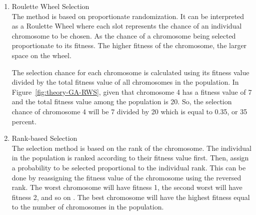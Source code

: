 \documentclass[12pt,oneside,openright,a4paper]{cpe-english-project}
\begin{document}
\begin{itemize}
\begin{enumerate}
		\item Roulette Wheel Selection \\
		The method is based on proportionate randomization. It can be interpreted as a Roulette Wheel where each slot represents the chance of an individual chromosome to be chosen. As the chance of a chromosome being selected proportionate to its fitness. The higher fitness of the chromosome, the larger space on the wheel.

		\begin{minipage}[c]{\textwidth}\centering
		\label{fig:theory-GA-RWS}
		\end{minipage}

		The selection chance for each chromosome is calculated using its fitness value divided by the total fitness value of all chromosomes in the population. In Figure~\ref{fig:theory-GA-RWS}, given that chromosome 4 has a fitness value of 7 and the total fitness value among the population is 20. So, the selection chance of chromosome 4 will be 7 divided by 20 which is equal to 0.35, or 35 percent.

		\item Rank-based Selection \\
		The selection method is based on the rank of the chromosome. The individual in the population is ranked according to their fitness value first. Then, assign a probability to be selected proportional to the individual rank. This can be done by reassigning the fitness value of the chromosome using the reversed rank. The worst chromosome will have fitness 1, the second worst will have fitness 2, and so on \cite{nidhi201comparative}. The best chromosome will have the highest fitness equal to the number of chromosomes in the population. \\


\end{enumerate}
\end{itemize}
\end{document}
